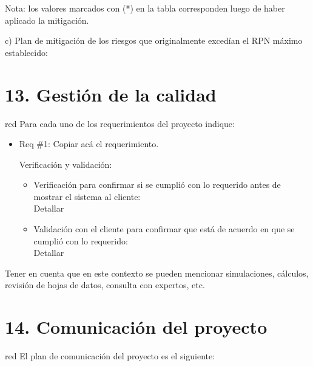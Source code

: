 \documentclass[11pt]{charter}
\begin{document}
Nota: los valores marcados con (*) en la tabla corresponden luego de haber aplicado la mitigación.

c) Plan de mitigación de los riesgos que originalmente excedían el RPN máximo establecido:


\section{13. Gestión de la calidad}
\label{sec:calidad}

\begin{consigna}{red}
Para cada uno de los requerimientos del proyecto indique:
\begin{itemize} 
\item Req \#1: Copiar acá el requerimiento.

Verificación y validación:

\begin{itemize}
\item Verificación para confirmar si se cumplió con lo requerido antes de mostrar el sistema al cliente:\\
Detallar 
\item Validación con el cliente para confirmar que está de acuerdo en que se cumplió con lo requerido:\\
Detallar  
\end{itemize}

\end{itemize}

Tener en cuenta que en este contexto se pueden mencionar simulaciones, cálculos, revisión de hojas de datos, consulta con expertos, etc.

\end{consigna}

\section{14. Comunicación del proyecto}
\label{sec:comunicaciones}

\begin{consigna}{red}
El plan de comunicación del proyecto es el siguiente:
\end{consigna}
\end{document}

